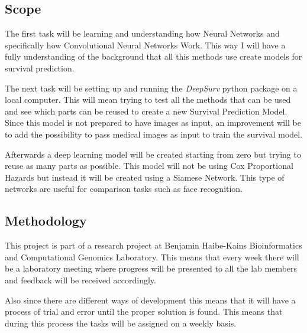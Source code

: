 \subsection{Scope}

The first task will be learning and understanding how Neural Networks and specifically how 
Convolutional Neural Networks Work. This way I will have a fully understanding of the background
that all this methods use create models for survival prediction.

The next task will be setting up and running the \emph{DeepSurv} python package on a local 
computer. This will mean trying to test all the methods that can be used and see which parts 
can be reused to create a new Survival Prediction Model. Since this model is not prepared
to have images as input, an improvement will be to add the possibility to pass medical 
images as input to train the survival model. 

Afterwards a deep learning model will be created starting from zero but trying to reuse
as many parts as possible. This model will not be using Cox Proportional Hazards but instead
it will be created using a Siamese Network. This type of networks are useful for comparison
tasks such as face recognition. 

\subsection{Methodology}

This project is part of a research project at Benjamin Haibe-Kains Bioinformatics and 
Computational Genomics Laboratory. This means that every week there will be a laboratory meeting
where progress will be presented to all the lab members and feedback will be received accordingly. 

Also since there are different ways of development this means that it will have a process of trial
and error until the proper solution is found. This means that during this process the
tasks will be assigned on a weekly basis.
